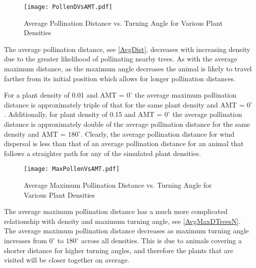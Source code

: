 \begin{figure}
  \begin{center}
  \texttt{[image: PollenDVsAMT.pdf]}
  \end{center}
  \caption{\small Average Pollination Distance vs. Turning Angle for Various Plant Densities}
  \label{AvgDist}
\end{figure}

The average pollination distance, see \autoref{AvgDist}, decreases with increasing density due to
the greater likelihood of pollinating nearby trees.  As with the average maximum distance, as the
maximum angle decreases the animal is likely to travel farther from its initial position which
allows for longer pollination distances.

For a plant density of 0.01 and AMT = $0^\circ$ the average maximum pollination distance is
approximately triple of that for the same plant density and AMT = $0^\circ$. Additionally, for plant
density of 0.15 and AMT = $0^\circ$ the average pollination distance is approximately double of the
average pollination distance for the same density and AMT = $180^\circ$. Clearly, the average
pollination distance for wind dispersal is less than that of an average pollination distance for an
animal that follows a straighter path for any of the simulated plant densities.

\begin{figure}
  \begin{center}
  \texttt{[image: MaxPollenVsAMT.pdf]}
  \end{center}
  \caption{\small Average Maximum Pollination Distance vs. Turning Angle for Various Plant Densities}
  \label{AvgMaxDTreesN}
\end{figure}

The average maximum pollination distance has a much more complicated relationship with density and
maximum turning angle, see \autoref{AvgMaxDTreesN}.  The average maximum pollination distance
decreases as maximum turning angle increases from $0^{\circ}$ to $180^{\circ}$ across all densities.
This is due to animals covering a shorter distance for higher turning angles, and therefore the
plants that are visited will be closer together on average. 

